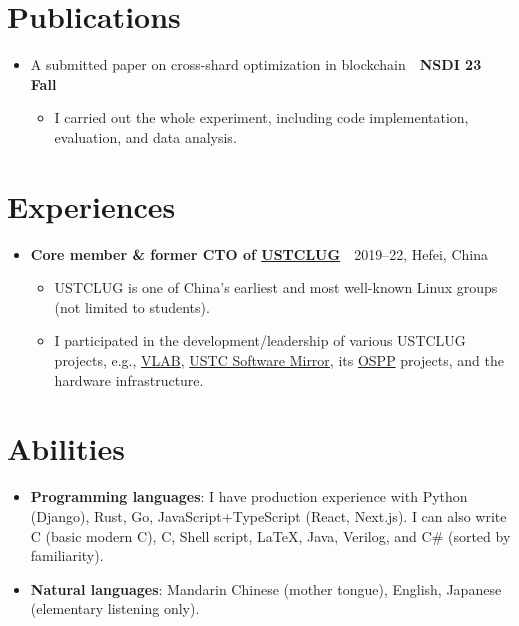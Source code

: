 \documentclass{article}
\newcommand{\Cpp}{C\nolinebreak[4]\hspace{-.05em}\raisebox{.4ex}{\tiny\bf ++}}
\newcommand{\Csharp}{C{\fontfaceLiberationSerif\#}}
\begin{document}
\section*{Publications}
\begin{itemize}[parsep=0.1cm,leftmargin=0.4cm]
  \item A submitted paper on cross-shard optimization in blockchain\ \dotfill\ \textbf{NSDI {\textquotesingle}23 Fall}
  \begin{itemize}[itemsep=0cm,parsep=0cm,topsep=0cm,leftmargin=0.25cm,label=]
    \item I carried out the whole experiment, including code implementation, evaluation, and data analysis.
  \end{itemize}
\end{itemize}

\section*{Experiences}
\begin{itemize}[parsep=0.1cm,leftmargin=0.4cm]
  \item \textbf{Core member \& former CTO of \href{https://lug.ustc.edu.cn/}{USTCLUG}}\ \dotfill\ 2019--22, Hefei, China
    \begin{itemize}[itemsep=0cm,parsep=0cm,topsep=0cm,leftmargin=0.25cm,label=]
      \item USTCLUG is one of China's earliest and most well-known Linux groups (not limited to students).
      \item I participated in the development/leadership of various USTCLUG projects, e.g., \href{https://vlab.ustc.edu.cn/}{VLAB}, \href{https://mirrors.ustc.edu.cn/}{USTC Software Mirror}, its \href{https://summer-ospp.ac.cn/}{OSPP} projects, and the hardware infrastructure.
    \end{itemize}
\end{itemize}

\section*{Abilities}
\begin{itemize}[parsep=0.1cm,leftmargin=0.4cm]
  \item \textbf{Programming languages}:
    I have production experience with Python (Django), Rust, Go, JavaScript+TypeScript (React, Next.js).
    I can also write \Cpp{} (basic modern \Cpp), C, Shell script, \LaTeX, Java, Verilog, and \Csharp{} (sorted by familiarity).
  \item \textbf{Natural languages}: Mandarin Chinese (mother tongue), English, Japanese (elementary listening only).
\end{itemize}

\blindtext[2]{}
\end{document}
